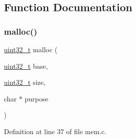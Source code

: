 \subsection{Function Documentation}
\mbox{\label{a00119_a9087e3504e5973deee6f3561705978c7_a9087e3504e5973deee6f3561705978c7}} 
\subsubsection{\texorpdfstring{malloc()}{malloc()}}
{\footnotesize\ttfamily \hyperlink{a00104_a435d1572bf3f880d55459d9805097f62_a435d1572bf3f880d55459d9805097f62}{uint32\+\_\+t} malloc (\begin{DoxyParamCaption}\item[{\hyperlink{a00104_a435d1572bf3f880d55459d9805097f62_a435d1572bf3f880d55459d9805097f62}{uint32\+\_\+t}}]{base,  }\item[{\hyperlink{a00104_a435d1572bf3f880d55459d9805097f62_a435d1572bf3f880d55459d9805097f62}{uint32\+\_\+t}}]{size,  }\item[{char $\ast$}]{purpose }\end{DoxyParamCaption})}



Definition at line 37 of file mem.\+c.


